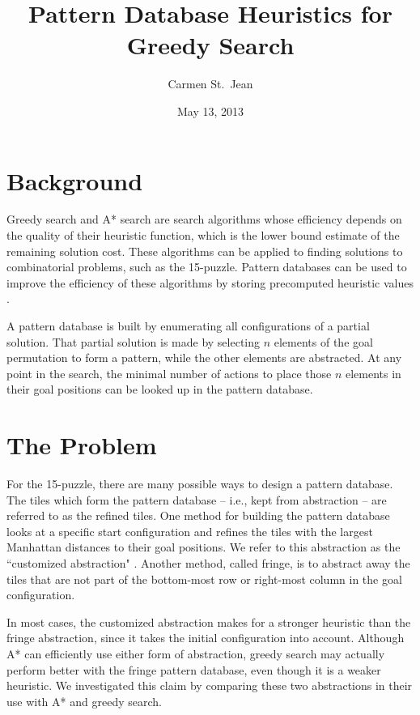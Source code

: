 \documentclass[letterpaper]{article}
\begin{document}
\title{Pattern Database Heuristics for Greedy Search}
\date{May 13, 2013}
\author{Carmen St.\ Jean}

\nocopyright{\gdef\copyright@on{}}

\maketitle

\section{Background}

Greedy search and A* search are search algorithms whose efficiency depends on the quality of their heuristic function, which is the lower bound estimate of the remaining solution cost.  These algorithms can be applied to finding solutions to combinatorial problems, such as the 15-puzzle.  Pattern databases can be used to improve the efficiency of these algorithms by storing precomputed heuristic values \cite{DBLP:journals/ci/CulbersonS98}.

A pattern database is built by enumerating all configurations of a partial solution.  That partial solution is made by selecting $n$ elements of the goal permutation to form a pattern, while the other elements are abstracted.  At any point in the search, the minimal number of actions to place those $n$ elements in their goal positions can be looked up in the pattern database.

\section{The Problem}

For the 15-puzzle, there are many possible ways to design a pattern database.  The tiles which form the pattern database -- i.e., kept from abstraction -- are referred to as the refined tiles.  One method for building the pattern database looks at a specific start configuration and refines the tiles with the largest Manhattan distances to their goal positions.  We refer to this abstraction as the ``customized abstraction" \cite{DBLP:conf/sara/HolteGT05}. Another method, called fringe, is to abstract away the tiles that are not part of the bottom-most row or right-most column in the goal configuration.

In most cases, the customized abstraction makes for a stronger heuristic than the fringe abstraction, since it takes the initial configuration into account.  Although A* can efficiently use either form of abstraction, greedy search may actually perform better with the fringe pattern database, even though it is a weaker heuristic.  We investigated this claim by comparing these two abstractions in their use with A* and greedy search. 
\end{document}
